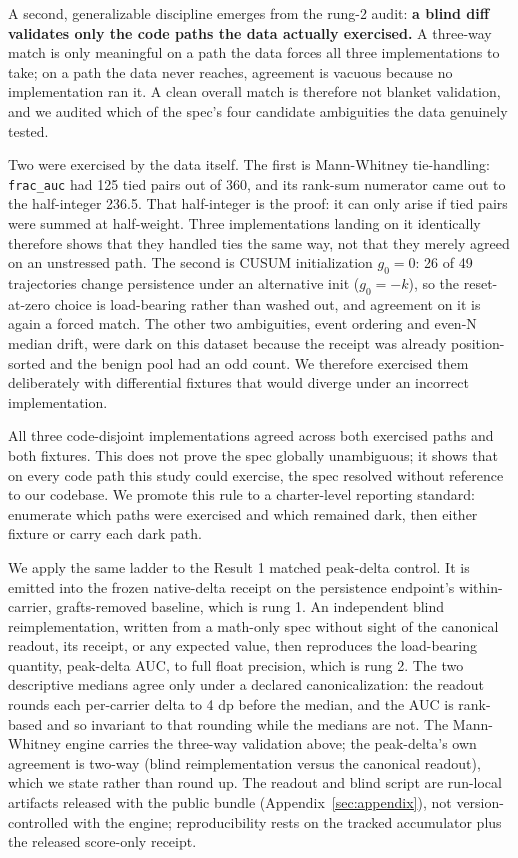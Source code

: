 \documentclass[11pt]{article}
\begin{document}
A second, generalizable discipline emerges from the rung-2 audit: \textbf{a blind diff validates only the
code paths the data actually exercised.} A three-way match is only meaningful on a path the data
forces all three implementations to take; on a path the data never reaches, agreement is vacuous
because no implementation ran it. A clean overall match is therefore not blanket validation, and we
audited which of the spec's four candidate ambiguities the data genuinely tested.

Two were exercised by the data itself. The first is Mann-Whitney tie-handling: \texttt{frac\_auc} had 125 tied
pairs out of 360, and its rank-sum numerator came out to the half-integer 236.5. That half-integer is the proof: it can only arise if tied pairs were summed at half-weight. Three implementations landing on it identically therefore shows that they handled ties the same way, not that they merely agreed on an unstressed path. The second is CUSUM initialization $g_0 = 0$: 26 of 49
trajectories change persistence under an alternative init ($g_0 = -k$), so the reset-at-zero choice is
load-bearing rather than washed out, and agreement on it is again a forced match. The other two ambiguities, event ordering and even-N median drift, were dark on this dataset because the receipt was already position-sorted and the benign pool had an odd count. We therefore exercised them deliberately with differential fixtures that would diverge under an incorrect implementation.

All three code-disjoint implementations agreed across both exercised paths and both fixtures. This does
not prove the spec globally unambiguous; it shows that on every code path this study could exercise,
the spec resolved without reference to our codebase. We promote this rule to a charter-level reporting standard: enumerate which paths were exercised and which remained dark, then either fixture or carry each dark path.

We apply the same ladder to the Result 1 matched peak-delta control. It is emitted into the frozen native-delta receipt on the persistence endpoint's within-carrier, grafts-removed baseline, which is rung 1. An independent blind reimplementation, written from a math-only spec without sight of the canonical readout, its receipt, or any expected value, then reproduces the load-bearing quantity, peak-delta AUC, to full float precision, which is rung 2. The two
descriptive medians agree only under a declared canonicalization: the readout rounds each per-carrier
delta to 4 dp before the median, and the AUC is rank-based and so invariant to that rounding while the
medians are not. The Mann-Whitney engine carries the three-way validation above; the peak-delta's own
agreement is two-way (blind reimplementation versus the canonical readout), which we state rather than
round up. The readout and blind script are
run-local artifacts released with the public bundle (Appendix~\ref{sec:appendix}), not version-controlled with the
engine; reproducibility rests on the tracked accumulator plus the released score-only receipt.
\end{document}
